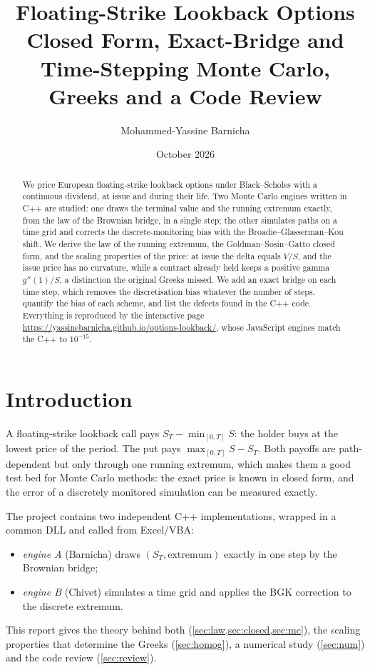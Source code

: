 \documentclass[11pt,a4paper]{article}
\title{Floating-Strike Lookback Options\\[4pt]
  \large Closed Form, Exact-Bridge and Time-Stepping Monte Carlo, Greeks and a Code Review}
\author{Mohammed-Yassine Barnicha}
\date{October 2026}
\theoremstyle{remark}
\begin{document}
\maketitle

\begin{abstract}
\noindent We price European floating-strike lookback options under Black--Scholes with a continuous dividend, at issue and
during their life. Two Monte Carlo engines written in C++ are studied: one draws the terminal value and the running extremum
exactly, from the law of the Brownian bridge, in a single step; the other simulates paths on a time grid and corrects the
discrete-monitoring bias with the Broadie--Glasserman--Kou shift. We derive the law of the running extremum, the
Goldman--Sosin--Gatto closed form, and the scaling properties of the price: at issue the delta equals $V/S$, and the issue
price has no curvature, while a contract already held keeps a positive gamma $g''(1)/S$, a distinction the original Greeks
missed. We add an exact bridge on each time step, which removes the discretisation bias whatever the number of steps, quantify
the bias of each scheme, and list the defects found in the C++ code. Everything is reproduced by the interactive page
\url{https://yassinebarnicha.github.io/options-lookback/}, whose JavaScript engines match the C++ to $10^{-15}$.
\end{abstract}

\tableofcontents

\section{Introduction}
A floating-strike lookback call pays $S_T-\min_{[0,T]}S$: the holder buys at the lowest price of the period. The put pays
$\max_{[0,T]}S-S_T$. Both payoffs are path-dependent but only through one running extremum, which makes them a good test bed
for Monte Carlo methods: the exact price is known in closed form, and the error of a discretely monitored simulation can be
measured exactly.

The project contains two independent C++ implementations, wrapped in a common DLL and called from Excel/VBA:
\begin{itemize}[nosep]
  \item \emph{engine A} (Barnicha) draws $(S_T,\text{extremum})$ exactly in one step by the Brownian bridge;
  \item \emph{engine B} (Chivet) simulates a time grid and applies the BGK correction to the discrete extremum.
\end{itemize}
This report gives the theory behind both (\cref{sec:law,sec:closed,sec:mc}), the scaling properties that determine the Greeks
(\cref{sec:homog}), a numerical study (\cref{sec:num}) and the code review (\cref{sec:review}).
\end{document}
